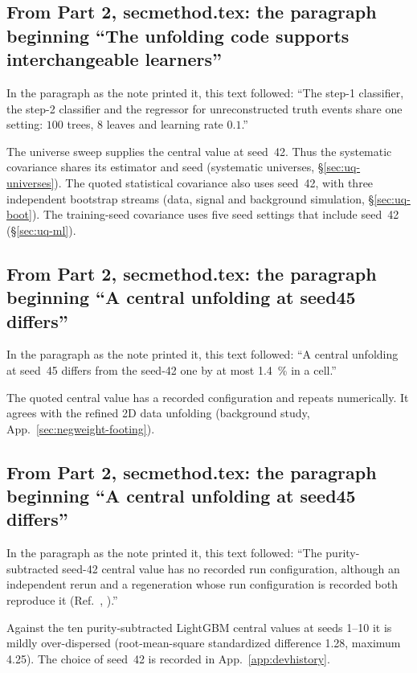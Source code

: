 \subsection{From Part 2, secmethod.tex: the paragraph beginning ``The unfolding code supports interchangeable learners''}
In the paragraph as the note printed it, this text followed: ``The step-1 classifier, the step-2 classifier and the regressor for unreconstructed truth events share one setting: $100$ trees, $8$ leaves and learning rate $0.1$.''\par
The universe sweep supplies the central value at seed~42. Thus the systematic covariance shares its estimator and seed (systematic universes, \S\ref{sec:uq-universes}). The quoted statistical covariance also uses seed~42, with three independent bootstrap streams (data, signal and background simulation, \S\ref{sec:uq-boot}). The training-seed covariance uses five seed settings that include seed~42 (\S\ref{sec:uq-ml}).

\subsection{From Part 2, secmethod.tex: the paragraph beginning ``A central unfolding at seed45 differs''}
In the paragraph as the note printed it, this text followed: ``A central unfolding at seed~45 differs from the seed-42 one by at most \SI{1.4}{\percent} in a cell.''\par
The quoted central value has a recorded configuration and repeats numerically. It agrees with the refined 2D data unfolding (background study, App.~\ref{sec:negweight-footing}).

\subsection{From Part 2, secmethod.tex: the paragraph beginning ``A central unfolding at seed45 differs''}
In the paragraph as the note printed it, this text followed: ``The purity-subtracted seed-42 central value has no recorded run configuration, although an independent rerun and a regeneration whose run configuration is recorded both reproduce it (Ref.~\cite{NoteRecords2026}, ).''\par
Against the ten purity-subtracted LightGBM central values at seeds 1--10 it is mildly over-dispersed (root-mean-square standardized difference 1.28, maximum 4.25). The choice of seed~42 is recorded in App.~\ref{app:devhistory}.

